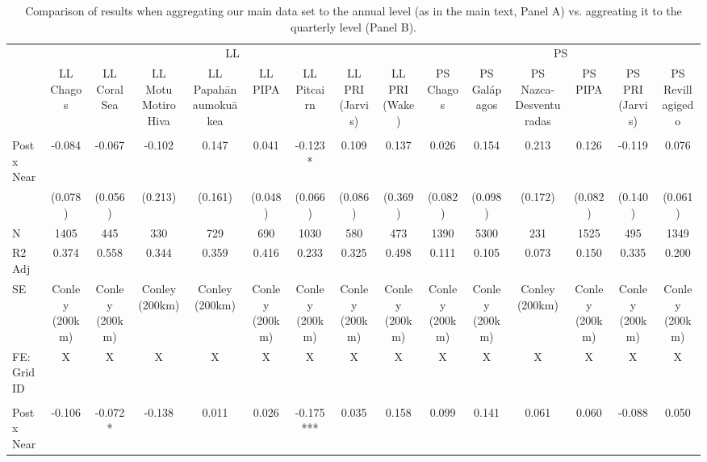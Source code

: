 \begin{table}

\caption{Comparison of results when aggregating our main data set to the annual level (as in the main text, Panel A) vs. aggreating it to the quarterly level (Panel B).}
\centering
\begin{tabular}[t]{lcccccccccccccc}
\toprule
\multicolumn{1}{c}{ } & \multicolumn{8}{c}{LL} & \multicolumn{6}{c}{PS} \\
\cmidrule(l{3pt}r{3pt}){2-9} \cmidrule(l{3pt}r{3pt}){10-15}
 & LL Chagos & LL Coral Sea & LL Motu Motiro Hiva & LL Papahānaumokuākea & LL PIPA & LL Pitcairn & LL PRI (Jarvis) & LL PRI (Wake) & PS Chagos & PS Galápagos & PS Nazca-Desventuradas & PS PIPA & PS PRI (Jarvis) & PS Revillagigedo\\
\midrule
\addlinespace[0.3em]
\multicolumn{15}{l}{Panel A: Aggregating data to the year-flag level (form main text)}\\
\hspace{1em}Post x Near & -0.084 & -0.067 & -0.102 & 0.147 & 0.041 & -0.123* & 0.109 & 0.137 & 0.026 & 0.154 & 0.213 & 0.126 & -0.119 & 0.076\\
\hspace{1em} & (0.078) & (0.056) & (0.213) & (0.161) & (0.048) & (0.066) & (0.086) & (0.369) & (0.082) & (0.098) & (0.172) & (0.082) & (0.140) & (0.061)\\
\hspace{1em}N & 1405 & 445 & 330 & 729 & 690 & 1030 & 580 & 473 & 1390 & 5300 & 231 & 1525 & 495 & 1349\\
\hspace{1em}R2 Adj & 0.374 & 0.558 & 0.344 & 0.359 & 0.416 & 0.233 & 0.325 & 0.498 & 0.111 & 0.105 & 0.073 & 0.150 & 0.335 & 0.200\\
\hspace{1em}SE & Conley (200km) & Conley (200km) & Conley (200km) & Conley (200km) & Conley (200km) & Conley (200km) & Conley (200km) & Conley (200km) & Conley (200km) & Conley (200km) & Conley (200km) & Conley (200km) & Conley (200km) & Conley \vphantom{1} (200km)\\
\hspace{1em}FE: Grid ID & X & X & X & X & X & X & X & X & X & X & X & X & X & \vphantom{1} X\\
\addlinespace[0.5cm]
\multicolumn{15}{l}{Panel B: Aggregatign data to tye year-quarter-flag level}\\
\hspace{1em}Post x Near & -0.106 & -0.072* & -0.138 & 0.011 & 0.026 & -0.175*** & 0.035 & 0.158 & 0.099 & 0.141 & 0.061 & 0.060 & -0.088 & 0.050\\

\end{tabular}
\end{table}
